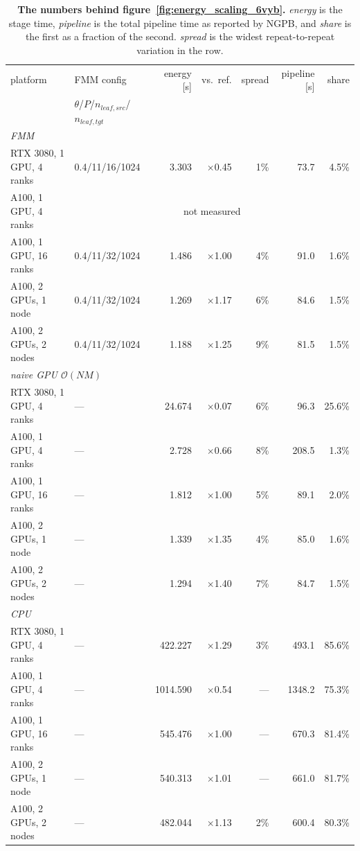 \begin{table}[!htb]
\centering
\footnotesize
\setlength{\tabcolsep}{4.5pt}
\caption[Energy-stage scaling against the whole pipeline]{\textbf{The numbers
    behind figure~\ref{fig:energy_scaling_6vyb}.} \emph{energy} is the stage
    time, \emph{pipeline} is the total pipeline time as reported by NGPB, and
    \emph{share} is the first as a fraction of the second. \emph{spread} is
    the widest repeat-to-repeat variation in the row.}
\label{tab:energy_scaling_6vyb}
\begin{tabular}{llrrrrr}
\toprule
platform & FMM config & energy [s] & vs.\ ref. & spread & pipeline [s] & share \\
         & {\footnotesize $\theta$/$P$/$n_{leaf,src}$/$n_{leaf,tgt}$} & & & & & \\
\midrule
\multicolumn{7}{l}{\emph{FMM}} \\
RTX 3080, 1 GPU, 4 ranks & 0.4/11/16/1024 & 3.303 & $\times$0.45 & 1\% & 73.7 & 4.5\% \\
A100, 1 GPU, 4 ranks & \multicolumn{6}{c}{not measured} \\
A100, 1 GPU, 16 ranks & 0.4/11/32/1024 & 1.486 & $\times$1.00 & 4\% & 91.0 & 1.6\% \\
A100, 2 GPUs, 1 node & 0.4/11/32/1024 & 1.269 & $\times$1.17 & 6\% & 84.6 & 1.5\% \\
A100, 2 GPUs, 2 nodes & 0.4/11/32/1024 & 1.188 & $\times$1.25 & 9\% & 81.5 & 1.5\% \\
\midrule
\multicolumn{7}{l}{\emph{naive GPU $\mathcal{O}(NM)$}} \\
RTX 3080, 1 GPU, 4 ranks & --- & 24.674 & $\times$0.07 & 6\% & 96.3 & 25.6\% \\
A100, 1 GPU, 4 ranks & --- & 2.728 & $\times$0.66 & 8\% & 208.5 & 1.3\% \\
A100, 1 GPU, 16 ranks & --- & 1.812 & $\times$1.00 & 5\% & 89.1 & 2.0\% \\
A100, 2 GPUs, 1 node & --- & 1.339 & $\times$1.35 & 4\% & 85.0 & 1.6\% \\
A100, 2 GPUs, 2 nodes & --- & 1.294 & $\times$1.40 & 7\% & 84.7 & 1.5\% \\
\midrule
\multicolumn{7}{l}{\emph{CPU}} \\
RTX 3080, 1 GPU, 4 ranks & --- & 422.227 & $\times$1.29 & 3\% & 493.1 & 85.6\% \\
A100, 1 GPU, 4 ranks & --- & 1014.590 & $\times$0.54 & --- & 1348.2 & 75.3\% \\
A100, 1 GPU, 16 ranks & --- & 545.476 & $\times$1.00 & --- & 670.3 & 81.4\% \\
A100, 2 GPUs, 1 node & --- & 540.313 & $\times$1.01 & --- & 661.0 & 81.7\% \\
A100, 2 GPUs, 2 nodes & --- & 482.044 & $\times$1.13 & 2\% & 600.4 & 80.3\% \\
\bottomrule
\end{tabular}
\end{table}
